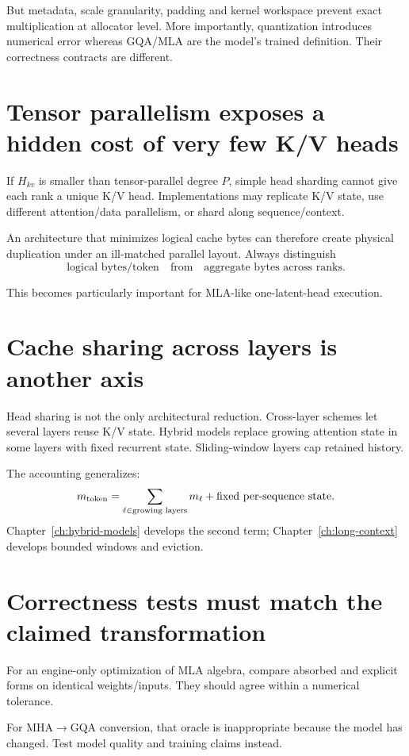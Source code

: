 But metadata, scale granularity, padding and kernel workspace prevent exact
multiplication at allocator level. More importantly, quantization introduces numerical
error whereas GQA/MLA are the model's trained definition. Their correctness contracts
are different.

\section{Tensor parallelism exposes a hidden cost of very few K/V heads}

If $H_{kv}$ is smaller than tensor-parallel degree $P$, simple head sharding cannot give
each rank a unique K/V head. Implementations may replicate K/V state, use different
attention/data parallelism, or shard along sequence/context.

An architecture that minimizes logical cache bytes can therefore create physical
duplication under an ill-matched parallel layout. Always distinguish
\[
\text{logical bytes/token}
\quad\text{from}\quad
\text{aggregate bytes across ranks}.
\]

This becomes particularly important for MLA-like one-latent-head execution.

\section{Cache sharing across layers is another axis}

Head sharing is not the only architectural reduction. Cross-layer schemes let several
layers reuse K/V state. Hybrid models replace growing attention state in some layers
with fixed recurrent state. Sliding-window layers cap retained history.

The accounting generalizes:
\[
m_{\rm token}=\sum_{\ell\in\text{growing layers}}m_\ell
+\text{fixed per-sequence state}.
\]
Chapter~\ref{ch:hybrid-models} develops the second term; Chapter~\ref{ch:long-context}
develops bounded windows and eviction.

\section{Correctness tests must match the claimed transformation}

For an engine-only optimization of MLA algebra, compare absorbed and explicit forms on
identical weights/inputs. They should agree within a numerical tolerance.

For MHA$\rightarrow$GQA conversion, that oracle is inappropriate because the model has
changed. Test model quality and training claims instead.

